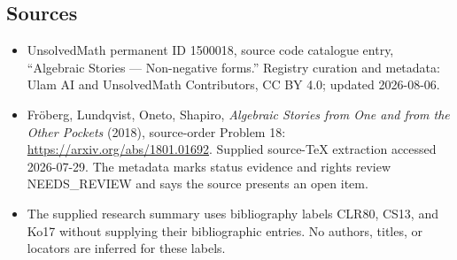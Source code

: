 \documentclass[11pt]{article}
\begin{document}
\subsection{Sources}
\begin{itemize}
\item UnsolvedMath permanent ID 1500018, source code catalogue entry, ``Algebraic Stories --- Non-negative forms.'' Registry curation and metadata: Ulam AI and UnsolvedMath Contributors, CC BY 4.0; updated 2026-08-06.
\item Fröberg, Lundqvist, Oneto, Shapiro, \emph{Algebraic Stories from One and from the Other Pockets} (2018), source-order Problem 18: \url{https://arxiv.org/abs/1801.01692}. Supplied source-TeX extraction accessed 2026-07-29. The metadata marks status evidence and rights review NEEDS\_REVIEW and says the source presents an open item.
\item The supplied research summary uses bibliography labels CLR80, CS13, and Ko17 without supplying their bibliographic entries. No authors, titles, or locators are inferred for these labels.
\end{itemize}
\end{document}
